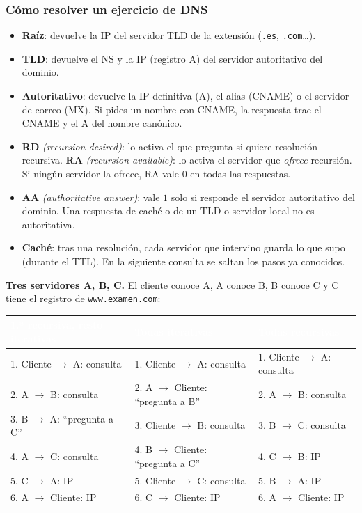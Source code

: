 \documentclass[11pt,a4paper]{article}
\newcommand{\hd}[1]{\cellcolor{uahblue}\textcolor{white}{\textbf{#1}}}
\newcommand{\en}[1]{\emph{(#1)}}
\begin{document}
\subsubsection{Cómo resolver un ejercicio de DNS}

\begin{definicion}
\begin{itemize}[leftmargin=1.2em]
  \item \textbf{Raíz}: devuelve la IP del servidor TLD de la extensión (\texttt{.es}, \texttt{.com}\dots).
  \item \textbf{TLD}: devuelve el NS y la IP (registro A) del servidor autoritativo del dominio.
  \item \textbf{Autoritativo}: devuelve la IP definitiva (A), el alias (CNAME) o el servidor de correo (MX). Si pides un nombre con CNAME, la respuesta trae el CNAME y el A del nombre canónico.
  \item \textbf{RD} \en{recursion desired}: lo activa el que pregunta si quiere resolución recursiva. \textbf{RA} \en{recursion available}: lo activa el servidor que \emph{ofrece} recursión. Si ningún servidor la ofrece, RA vale $0$ en todas las respuestas.
  \item \textbf{AA} \en{authoritative answer}: vale $1$ solo si responde el servidor autoritativo del dominio. Una respuesta de caché o de un TLD o servidor local no es autoritativa.
  \item \textbf{Caché}: tras una resolución, cada servidor que intervino guarda lo que supo (durante el TTL). En la siguiente consulta se saltan los pasos ya conocidos.
\end{itemize}
\end{definicion}

\textbf{Tres servidores A, B, C.} El cliente conoce A, A conoce B, B conoce C y C tiene el registro de \texttt{www.examen.com}:

\begin{tabularx}{\textwidth}{@{}L{3.6cm}XX@{}}
\toprule
\hd{1.ª recursiva, resto iterativas} & \hd{Todas iterativas} & \hd{Todas recursivas} \\
. Cliente $\to$ A: consulta & 1. Cliente $\to$ A: consulta & 1. Cliente $\to$ A: consulta \\
2. A $\to$ B: consulta & 2. A $\to$ Cliente: ``pregunta a B'' & 2. A $\to$ B: consulta \\
3. B $\to$ A: ``pregunta a C'' & 3. Cliente $\to$ B: consulta & 3. B $\to$ C: consulta \\
4. A $\to$ C: consulta & 4. B $\to$ Cliente: ``pregunta a C'' & 4. C $\to$ B: IP \\
5. C $\to$ A: IP & 5. Cliente $\to$ C: consulta & 5. B $\to$ A: IP \\
6. A $\to$ Cliente: IP & 6. C $\to$ Cliente: IP & 6. A $\to$ Cliente: IP \\
\bottomrule
\end{tabularx}
\end{document}
